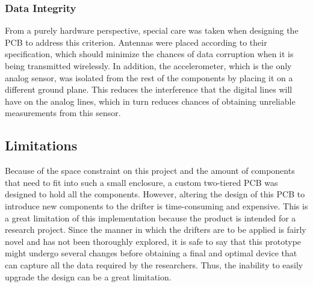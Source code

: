 \subsubsection{Data Integrity}
From a purely hardware perspective, special care was taken when designing the PCB to address this criterion.  Antennas were placed according to their specification, which should minimize the chances of data corruption when it is being transmitted wirelessly.  In addition, the accelerometer, which is the only analog sensor, was isolated from the rest of the components by placing it on a different ground plane.  This reduces the interference that the digital lines will have on the analog lines, which in turn reduces chances of obtaining unreliable measurements from this sensor.

\subsection{Limitations}
Because of the space constraint on this project and the amount of components that need to fit into such a small enclosure, a custom two-tiered PCB was designed to hold all the components.  However, altering the design of this PCB to introduce new components to the drifter is time-consuming and expensive.  This is a great limitation of this implementation because the product is intended for a research project.  Since the manner in which the drifters are to be applied is fairly novel and has not been thoroughly explored, it is safe to say that this prototype might undergo several changes before obtaining a final and optimal device that can capture all the data required by the researchers. Thus, the inability to easily upgrade the design can be a great limitation.
